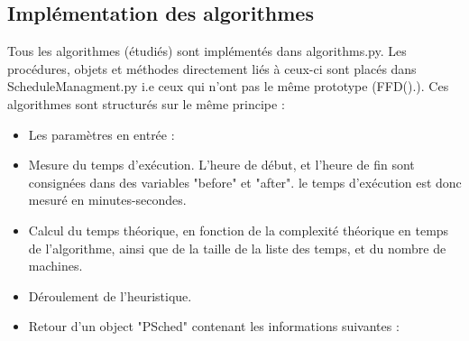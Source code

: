 \documentclass[a4paper,12pt]{report}
\theoremstyle{plain}				%
\theoremstyle{definition}				%
\begin{document}
\subsection{Implémentation des algorithmes}
\label{subsec:Implémentation des algorithmes}
Tous les algorithmes (étudiés) sont implémentés dans algorithms.py. Les procédures, objets et méthodes directement liés à ceux-ci sont placés dans ScheduleManagment.py i.e ceux qui n'ont pas le même prototype (FFD().). 
Ces algorithmes sont structurés sur le même principe :
\begin{itemize}

\item Les paramètres en entrée :

\item Mesure du temps d'exécution. L'heure de début, et l'heure de fin 
sont consignées dans des variables "before" et "after". 
le temps d'exécution est donc mesuré en minutes-secondes.

\item Calcul du temps théorique, en fonction de la complexité théorique 
en temps de l’algorithme, ainsi que de la taille de la liste des temps, 
et du nombre de machines.

\item Déroulement de l'heuristique.

\item Retour d'un object "PSched" contenant les informations suivantes :
\end{itemize}
\end{document}
